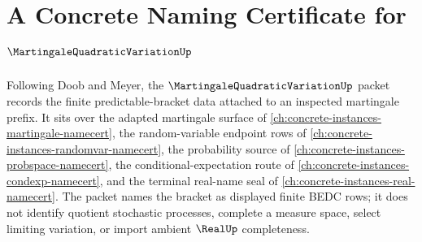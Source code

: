\chapter{A Concrete Naming Certificate for $\MartingaleQuadraticVariationUp$}
\label{ch:concrete-instances-martingale-quadratic-variation-namecert}

Following Doob and Meyer, the $\MartingaleQuadraticVariationUp$ packet records the finite predictable-bracket data attached to an inspected martingale prefix. It sits over the adapted martingale surface of \autoref{ch:concrete-instances-martingale-namecert}, the random-variable endpoint rows of \autoref{ch:concrete-instances-randomvar-namecert}, the probability source of \autoref{ch:concrete-instances-probspace-namecert}, the conditional-expectation route of \autoref{ch:concrete-instances-condexp-namecert}, and the terminal real-name seal of \autoref{ch:concrete-instances-real-namecert}. The packet names the bracket as displayed finite BEDC rows; it does not identify quotient stochastic processes, complete a measure space, select limiting variation, or import ambient $\RealUp$ completeness.

